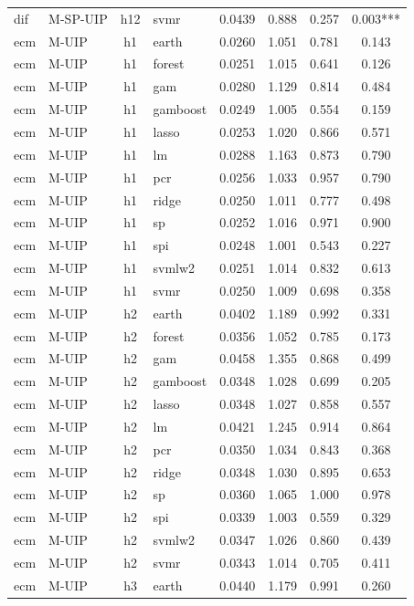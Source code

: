 \begin{ThreePartTable}
\begin{longtable}[t]{llclcccc}
dif & M-SP-UIP & h12 & svmr & 0.0439 & 0.888 & 0.257 & 0.003***\\
\addlinespace
ecm & M-UIP & h1 & earth & 0.0260 & 1.051 & 0.781 & 0.143\\
ecm & M-UIP & h1 & forest & 0.0251 & 1.015 & 0.641 & 0.126\\
ecm & M-UIP & h1 & gam & 0.0280 & 1.129 & 0.814 & 0.484\\
ecm & M-UIP & h1 & gamboost & 0.0249 & 1.005 & 0.554 & 0.159\\
ecm & M-UIP & h1 & lasso & 0.0253 & 1.020 & 0.866 & 0.571\\
ecm & M-UIP & h1 & lm & 0.0288 & 1.163 & 0.873 & 0.790\\
ecm & M-UIP & h1 & pcr & 0.0256 & 1.033 & 0.957 & 0.790\\
ecm & M-UIP & h1 & ridge & 0.0250 & 1.011 & 0.777 & 0.498\\
ecm & M-UIP & h1 & sp & 0.0252 & 1.016 & 0.971 & 0.900\\
ecm & M-UIP & h1 & spi & 0.0248 & 1.001 & 0.543 & 0.227\\
ecm & M-UIP & h1 & svmlw2 & 0.0251 & 1.014 & 0.832 & 0.613\\
ecm & M-UIP & h1 & svmr & 0.0250 & 1.009 & 0.698 & 0.358\\
\addlinespace
ecm & M-UIP & h2 & earth & 0.0402 & 1.189 & 0.992 & 0.331\\
ecm & M-UIP & h2 & forest & 0.0356 & 1.052 & 0.785 & 0.173\\
ecm & M-UIP & h2 & gam & 0.0458 & 1.355 & 0.868 & 0.499\\
ecm & M-UIP & h2 & gamboost & 0.0348 & 1.028 & 0.699 & 0.205\\
ecm & M-UIP & h2 & lasso & 0.0348 & 1.027 & 0.858 & 0.557\\
ecm & M-UIP & h2 & lm & 0.0421 & 1.245 & 0.914 & 0.864\\
ecm & M-UIP & h2 & pcr & 0.0350 & 1.034 & 0.843 & 0.368\\
ecm & M-UIP & h2 & ridge & 0.0348 & 1.030 & 0.895 & 0.653\\
ecm & M-UIP & h2 & sp & 0.0360 & 1.065 & 1.000 & 0.978\\
ecm & M-UIP & h2 & spi & 0.0339 & 1.003 & 0.559 & 0.329\\
ecm & M-UIP & h2 & svmlw2 & 0.0347 & 1.026 & 0.860 & 0.439\\
ecm & M-UIP & h2 & svmr & 0.0343 & 1.014 & 0.705 & 0.411\\
\addlinespace
ecm & M-UIP & h3 & earth & 0.0440 & 1.179 & 0.991 & 0.260\\

\end{longtable}
\end{ThreePartTable}
